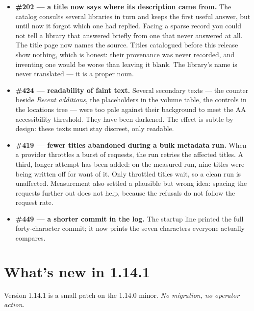 \begin{itemize}
  \item \textbf{\#202 \string— a title now says where its description
        came from.} The catalog consults several libraries in turn and
        keeps the first useful answer, but until now it forgot which
        one had replied. Facing a sparse record you could not tell a
        library that answered briefly from one that never answered at
        all. The title page now names the source. Titles catalogued
        before this release show nothing, which is honest: their
        provenance was never recorded, and inventing one would be
        worse than leaving it blank. The library's name is never
        translated \string— it is a proper noun.
  \item \textbf{\#424 \string— readability of faint text.} Several
        secondary texts \string— the counter beside \emph{Recent
        additions}, the placeholders in the volume table, the controls
        in the locations tree \string— were too pale against their
        background to meet the AA accessibility threshold. They have
        been darkened. The effect is subtle by design: these texts
        must stay discreet, only readable.
  \item \textbf{\#419 \string— fewer titles abandoned during a bulk
        metadata run.} When a provider throttles a burst of requests,
        the run retries the affected titles. A third, longer attempt
        has been added: on the measured run, nine titles were being
        written off for want of it. Only throttled titles wait, so a
        clean run is unaffected. Measurement also settled a plausible
        but wrong idea: spacing the requests further out does not
        help, because the refusals do not follow the request rate.
  \item \textbf{\#449 \string— a shorter commit in the log.} The
        startup line printed the full forty-character commit; it now
        prints the seven characters everyone actually compares.
\end{itemize}

\section{What's new in 1.14.1}\label{sec:whats-new-1.14.1}

Version 1.14.1 is a small patch on the 1.14.0 minor. \emph{No
migration, no operator action.}

